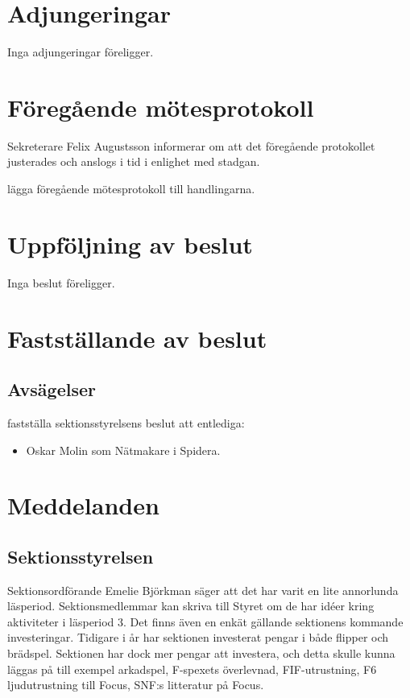 \documentclass[hidelinks]{sektionsmote} %
\begin{document}
\section{Adjungeringar}
Inga adjungeringar föreligger.


\section{Föregående mötesprotokoll}
Sekreterare Felix Augustsson informerar om att det föregående protokollet justerades och anslogs i tid i enlighet med stadgan.
\begin{beslut}
    \item lägga föregående mötesprotokoll till handlingarna. 
\end{beslut}


\section{Uppföljning av beslut}
Inga beslut föreligger.


\section{Fastställande av beslut}
\subsection{Avsägelser}
\begin{beslut}
  \item fastställa sektionsstyrelsens beslut att entlediga:
  \begin{itemize}
      \item Oskar Molin som Nätmakare i Spidera.
  \end{itemize}
\end{beslut}


\section{Meddelanden}
\subsection{Sektionsstyrelsen}
Sektionsordförande Emelie Björkman säger att det har varit en lite annorlunda läsperiod.
Sektionsmedlemmar kan skriva till Styret om de har idéer kring aktiviteter i läsperiod 3.
Det finns även en enkät gällande sektionens kommande investeringar.
Tidigare i år har sektionen investerat pengar i både flipper och brädspel.
Sektionen har dock mer pengar att investera, och detta skulle kunna läggas på till exempel arkadspel, F-spexets överlevnad, FIF-utrustning, F6 ljudutrustning till Focus, SNF:s litteratur på Focus.
\end{document}
